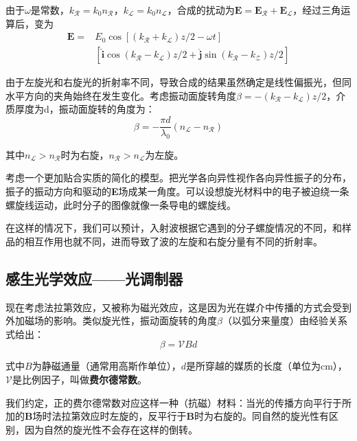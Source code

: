 \documentclass[UTF8]{ctexart}
\begin{document}
	由于$\omega$是常数，$k_{\mathscr{R}}=k_{0} n_{\mathscr{R}}$，$k_{\mathscr{L}}=k_{0} n_{\mathscr{L}}$，合成的扰动为$\mathbf{E}=\mathbf{E}_{\mathscr{R}}+\mathbf{E}_{\mathscr{L}}$，经过三角运算后，变为
	\begin{equation}
	\begin{aligned}
	\mathbf{E}=&E_{0} \cos \left[\left(k_{\mathscr{R}}+k_{\mathscr{L}}\right) z / 2-\omega t\right]\\
	&\left[\hat{\mathbf{i}} \cos \left(k_{\mathscr{R}}-k_{\mathscr{L}}\right) z / 2+\hat{\mathbf{j}} \sin \left(k_{\mathscr{R}}-k_{\mathscr{Z}}\right) z / 2 \right]
	\end{aligned}
	\end{equation}
	
	由于左旋光和右旋光的折射率不同，导致合成的结果虽然确定是线性偏振光，但同水平方向的夹角始终在发生变化。考虑振动面旋转角度$\beta=-\left(k_{\mathscr{R}}-k_{\mathscr{L}}\right) z / 2$，介质厚度为d，振动面旋转的角度为：
	\begin{equation}
	\beta=-\frac{\pi
	d}{\lambda_{0}}\left(n_{\mathscr{L}}-n_{\mathscr{R}}\right)
	\end{equation}
	
	\noindent 其中$n_{\mathscr{L}}>n_{\mathscr{R}}$时为右旋，$n_{\mathscr{R}}>n_{\mathscr{L}}$为左旋。
	
	考虑一个更加贴合实质的简化的模型。把光学各向异性视作各向异性振子的分布，振子的振动方向和驱动的\textbf{E}场成某一角度。可以设想旋光材料中的电子被迫绕一条螺旋线运动，此时分子的图像就像一条导电的螺旋线。
	
	在这样的情况下，我们可以预计，入射波根据它遇到的分子螺旋情况的不同，和样品的相互作用也就不同，进而导致了波的左旋和右旋分量有不同的折射率。
	
	\subsection{感生光学效应——光调制器}
	现在考虑法拉第效应，又被称为磁光效应，这是因为光在媒介中传播的方式会受到外加磁场的影响。类似旋光性，振动面旋转的角度$\beta$（以弧分来量度）由经验关系式给出：
	\begin{equation}
		\beta=\mathscr{V} B d
	\end{equation}
	
	\noindent 式中$B$为静磁通量（通常用高斯作单位），$d$是所穿越的媒质的长度（单位为cm），$\mathscr{V}$是比例因子，叫做\textbf{费尔德常数}。
	
	我们约定，正的费尔德常数对应这样一种（抗磁）材料：当光的传播方向平行于所加的\textbf{B}场时法拉第效应时左旋的，反平行于\textbf{B}时为右旋的。同自然的旋光性有区别，因为自然的旋光性不会存在这样的倒转。
	
\end{document}
